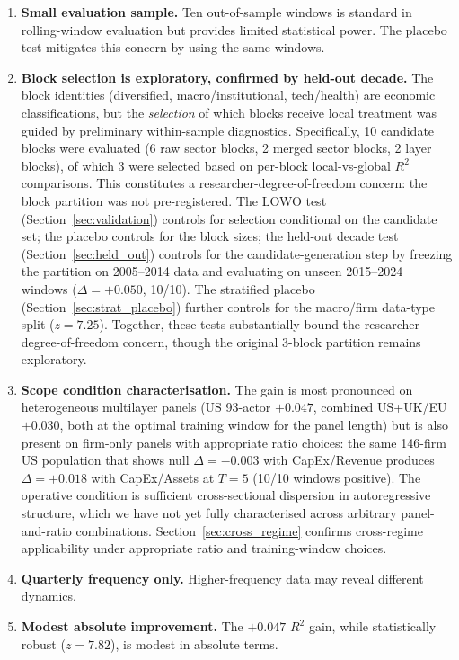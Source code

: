 \documentclass[11pt,a4paper]{article}
\begin{document}
\begin{enumerate}[nosep]
  \item \textbf{Small evaluation sample.} Ten out-of-sample windows is standard in rolling-window evaluation but provides limited statistical power. The placebo test mitigates this concern by using the same windows.
  \item \textbf{Block selection is exploratory, confirmed by held-out decade.} The block identities (diversified, macro/institutional, tech/health) are economic classifications, but the \emph{selection} of which blocks receive local treatment was guided by preliminary within-sample diagnostics. Specifically, 10 candidate blocks were evaluated (6 raw sector blocks, 2 merged sector blocks, 2 layer blocks), of which 3 were selected based on per-block local-vs-global $R^2$ comparisons. This constitutes a researcher-degree-of-freedom concern: the block partition was not pre-registered. The LOWO test (Section~\ref{sec:validation}) controls for selection conditional on the candidate set; the placebo controls for the block sizes; the held-out decade test (Section~\ref{sec:held_out}) controls for the candidate-generation step by freezing the partition on 2005--2014 data and evaluating on unseen 2015--2024 windows ($\Delta = +0.050$, 10/10). The stratified placebo (Section~\ref{sec:strat_placebo}) further controls for the macro/firm data-type split ($z = 7.25$). Together, these tests substantially bound the researcher-degree-of-freedom concern, though the original 3-block partition remains exploratory.
  \item \textbf{Scope condition characterisation.} The gain is most pronounced on heterogeneous multilayer panels (US 93-actor $+0.047$, combined US+UK/EU $+0.030$, both at the optimal training window for the panel length) but is also present on firm-only panels with appropriate ratio choices: the same 146-firm US population that shows null $\Delta = -0.003$ with CapEx/Revenue produces $\Delta = +0.018$ with CapEx/Assets at $T=5$ (10/10 windows positive). The operative condition is sufficient cross-sectional dispersion in autoregressive structure, which we have not yet fully characterised across arbitrary panel-and-ratio combinations. Section~\ref{sec:cross_regime} confirms cross-regime applicability under appropriate ratio and training-window choices.
  \item \textbf{Quarterly frequency only.} Higher-frequency data may reveal different dynamics.
  \item \textbf{Modest absolute improvement.} The $+0.047$ $R^2$ gain, while statistically robust ($z = 7.82$), is modest in absolute terms.

\end{enumerate}
\end{document}
